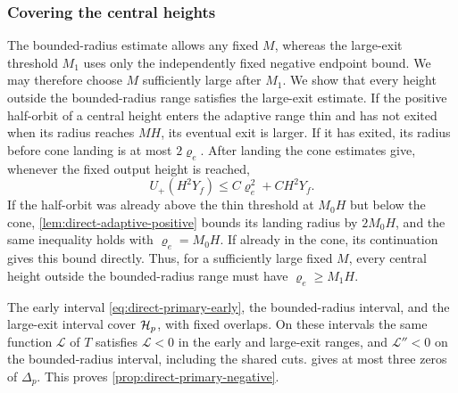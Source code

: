 \subsubsection{Covering the central heights}

The bounded-radius estimate allows any fixed \(M\), whereas the
large-exit threshold \(M_1\) uses only the independently fixed negative
endpoint bound. We may therefore choose \(M\) sufficiently large after
\(M_1\). We show that every height outside the bounded-radius range
satisfies the large-exit estimate. If the
positive half-orbit of a central height enters the adaptive range
thin and has not exited when its radius reaches \(MH\), its
eventual exit is larger.
If it has exited, its radius before cone landing is at most
\(2\varrho_e\). After landing the cone estimates give, whenever the
fixed output height is reached,
\[
 U_+(H^2Y_f)\le C\varrho_e^2+C H^2Y_f .
\]
If the half-orbit was already above the thin threshold at \(M_0H\) but
below the cone, \cref{lem:direct-adaptive-positive} bounds its landing
radius by \(2M_0H\), and the same inequality holds with
\(\varrho_e=M_0H\). If already in the cone, its continuation gives this
bound directly.
Thus, for a sufficiently large fixed \(M\), every central height
outside the bounded-radius range must have \(\varrho_e\ge M_1H\).

The early interval \eqref{eq:direct-primary-early}, the bounded-radius
interval, and the large-exit interval cover \(\mathcal H_p\), with fixed
overlaps. On these intervals the same function \(\mathcal L\) of \(T\)
satisfies \(\mathcal L<0\) in the early and large-exit ranges, and
\(\mathcal L''<0\) on the bounded-radius interval, including the
shared cuts.  gives at most three
zeros of \(\Delta_p\). This proves \cref{prop:direct-primary-negative}.
